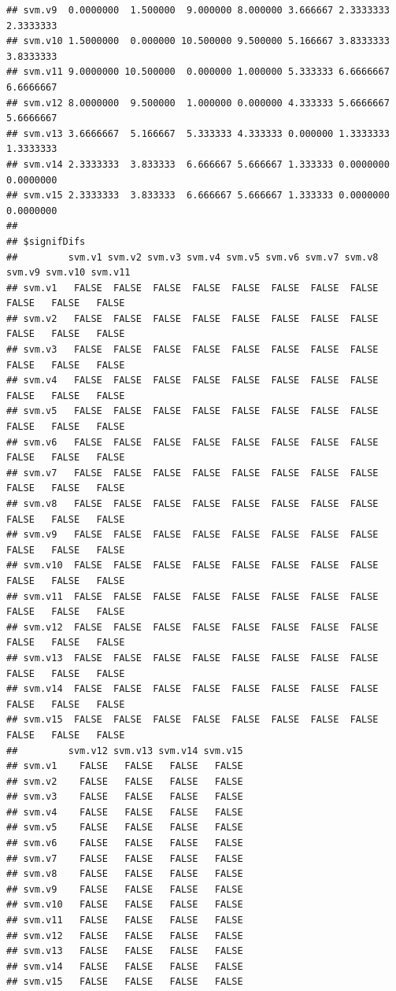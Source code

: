 \documentclass[10pt,a4paper]{article}\usepackage[]{graphicx}\usepackage[]{color}
\makeatletter
\newenvironment{kframe}{%
 \def\at@end@of@kframe{}%
 \ifinner\ifhmode%
  \def\at@end@of@kframe{\end{minipage}}%
  \begin{minipage}{\columnwidth}%
 \fi\fi%
 \def\FrameCommand##1{\hskip\@totalleftmargin \hskip-\fboxsep
 \colorbox{shadecolor}{##1}\hskip-\fboxsep
     \hskip-\linewidth \hskip-\@totalleftmargin \hskip\columnwidth}%
 \MakeFramed {\advance\hsize-\width
   \@totalleftmargin\z@ \linewidth\hsize
   \@setminipage}}%
 {\par\unskip\endMakeFramed%
 \at@end@of@kframe}
\newenvironment{knitrout}{}{} %
\makeatother
\begin{document}
\begin{knitrout}
\begin{kframe}
\begin{verbatim}
## svm.v9  0.0000000  1.500000  9.000000 8.000000 3.666667 2.3333333 2.3333333
## svm.v10 1.5000000  0.000000 10.500000 9.500000 5.166667 3.8333333 3.8333333
## svm.v11 9.0000000 10.500000  0.000000 1.000000 5.333333 6.6666667 6.6666667
## svm.v12 8.0000000  9.500000  1.000000 0.000000 4.333333 5.6666667 5.6666667
## svm.v13 3.6666667  5.166667  5.333333 4.333333 0.000000 1.3333333 1.3333333
## svm.v14 2.3333333  3.833333  6.666667 5.666667 1.333333 0.0000000 0.0000000
## svm.v15 2.3333333  3.833333  6.666667 5.666667 1.333333 0.0000000 0.0000000
## 
## $signifDifs
##         svm.v1 svm.v2 svm.v3 svm.v4 svm.v5 svm.v6 svm.v7 svm.v8 svm.v9 svm.v10 svm.v11
## svm.v1   FALSE  FALSE  FALSE  FALSE  FALSE  FALSE  FALSE  FALSE  FALSE   FALSE   FALSE
## svm.v2   FALSE  FALSE  FALSE  FALSE  FALSE  FALSE  FALSE  FALSE  FALSE   FALSE   FALSE
## svm.v3   FALSE  FALSE  FALSE  FALSE  FALSE  FALSE  FALSE  FALSE  FALSE   FALSE   FALSE
## svm.v4   FALSE  FALSE  FALSE  FALSE  FALSE  FALSE  FALSE  FALSE  FALSE   FALSE   FALSE
## svm.v5   FALSE  FALSE  FALSE  FALSE  FALSE  FALSE  FALSE  FALSE  FALSE   FALSE   FALSE
## svm.v6   FALSE  FALSE  FALSE  FALSE  FALSE  FALSE  FALSE  FALSE  FALSE   FALSE   FALSE
## svm.v7   FALSE  FALSE  FALSE  FALSE  FALSE  FALSE  FALSE  FALSE  FALSE   FALSE   FALSE
## svm.v8   FALSE  FALSE  FALSE  FALSE  FALSE  FALSE  FALSE  FALSE  FALSE   FALSE   FALSE
## svm.v9   FALSE  FALSE  FALSE  FALSE  FALSE  FALSE  FALSE  FALSE  FALSE   FALSE   FALSE
## svm.v10  FALSE  FALSE  FALSE  FALSE  FALSE  FALSE  FALSE  FALSE  FALSE   FALSE   FALSE
## svm.v11  FALSE  FALSE  FALSE  FALSE  FALSE  FALSE  FALSE  FALSE  FALSE   FALSE   FALSE
## svm.v12  FALSE  FALSE  FALSE  FALSE  FALSE  FALSE  FALSE  FALSE  FALSE   FALSE   FALSE
## svm.v13  FALSE  FALSE  FALSE  FALSE  FALSE  FALSE  FALSE  FALSE  FALSE   FALSE   FALSE
## svm.v14  FALSE  FALSE  FALSE  FALSE  FALSE  FALSE  FALSE  FALSE  FALSE   FALSE   FALSE
## svm.v15  FALSE  FALSE  FALSE  FALSE  FALSE  FALSE  FALSE  FALSE  FALSE   FALSE   FALSE
##         svm.v12 svm.v13 svm.v14 svm.v15
## svm.v1    FALSE   FALSE   FALSE   FALSE
## svm.v2    FALSE   FALSE   FALSE   FALSE
## svm.v3    FALSE   FALSE   FALSE   FALSE
## svm.v4    FALSE   FALSE   FALSE   FALSE
## svm.v5    FALSE   FALSE   FALSE   FALSE
## svm.v6    FALSE   FALSE   FALSE   FALSE
## svm.v7    FALSE   FALSE   FALSE   FALSE
## svm.v8    FALSE   FALSE   FALSE   FALSE
## svm.v9    FALSE   FALSE   FALSE   FALSE
## svm.v10   FALSE   FALSE   FALSE   FALSE
## svm.v11   FALSE   FALSE   FALSE   FALSE
## svm.v12   FALSE   FALSE   FALSE   FALSE
## svm.v13   FALSE   FALSE   FALSE   FALSE
## svm.v14   FALSE   FALSE   FALSE   FALSE
## svm.v15   FALSE   FALSE   FALSE   FALSE
\end{verbatim}
\end{kframe}
\end{knitrout}
\end{document}
